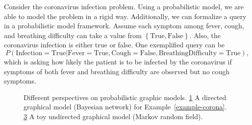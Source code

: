 \begin{example}\label{example-corona}
  Consider the coronavirus infection problem. Using a probabilistic model, we are able to model the problem in a rigid way. Additionally, we can formalize a query in a probabilistic model framework. Assume each symptom among fever, cough, and breathing difficulty can take a value from $\left\{ \mathrm{True}, \mathrm{False} \right\}$. Also, the coronavirus infection is either true or false. One exemplified query can be
  \begin{equation}
    P(\mathrm{Infection} = \mathrm{True} | \mathrm{Fever} = \mathrm{True}, \mathrm{Cough} = \mathrm{False}, \mathrm{Breathing Difficulty}= \mathrm{True}), \nonumber
  \end{equation}
  which is asking how likely the patient is to be infected by the coronavirus if symptoms of both fever and breathing difficulty are observed but no cough symptoms.

\end{example}

\begin{figure}[!t]
  \begin{subfigure}{.4\textwidth}
    \caption{}
    \label{fig:dag-coronavirus}
  \end{subfigure}\hspace{2.5cm}
  \begin{subfigure}{0.3\textwidth}
    \caption{}
    \label{fig:mrf-communication}
  \end{subfigure}
  \caption{Different perspectives on probabilistic graphic models. \ref{fig:dag-coronavirus} A directed graphical model (Bayesian network) for Example~\ref{example-corona}. \ref{fig:mrf-communication} A toy undirected graphical model (Markov random field).}
  \hspace{1cm}
\end{figure}


